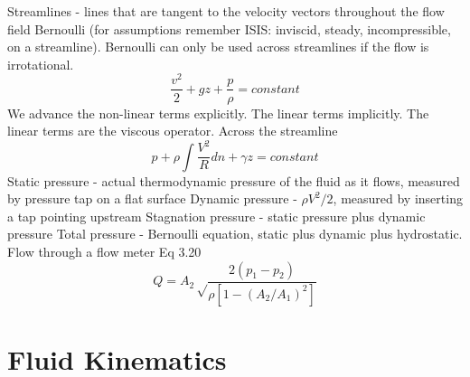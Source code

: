 \documentclass{article}
\begin{document}
Streamlines - lines that are tangent to the velocity vectors throughout the flow field
\newline
\newline
Bernoulli (for assumptions remember ISIS: inviscid, steady, incompressible, on a streamline). Bernoulli can only be used across streamlines if the flow is irrotational.
\begin{equation}
  \frac{v^2}{2}+gz+\frac{p}{\rho}=constant
\end{equation}
We advance the non-linear terms explicitly. The linear terms implicitly. The linear terms are the viscous operator. 
\newline
\newline
Across the streamline
\begin{equation}
    p + \rho\int\frac{V^2}{R}dn + \gamma z = constant
\end{equation}
\newline
\newline
Static pressure - actual thermodynamic pressure of the fluid as it flows, measured by pressure tap on a flat surface
\newline
\newline
Dynamic pressure - $\rho V^2/2$, measured by inserting a tap pointing upstream
\newline
\newline
Stagnation pressure - static pressure plus dynamic pressure
\newline
\newline
Total pressure - Bernoulli equation, static plus dynamic plus hydrostatic.
\newline
\newline
Flow through a flow meter Eq 3.20
\begin{equation}
    Q = A_2\sqrt\frac{2(p_1-p_2)}{\rho[1-(A_2/A_1)^2]}
\end{equation}


%
%
\newpage
\section{Fluid Kinematics}
\end{document}
